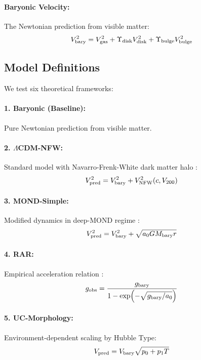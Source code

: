 \documentclass[aps,prd,twocolumn,superscriptaddress,nofootinbib,longbibliography]{revtex4-2}
\begin{document}
\paragraph{Baryonic Velocity:}
The Newtonian prediction from visible matter:
\begin{equation}
V_{\rm bary}^2 = V_{\rm gas}^2 + \Upsilon_{\rm disk} V_{\rm disk}^2 + \Upsilon_{\rm bulge} V_{\rm bulge}^2
\end{equation}

\subsection{Model Definitions}

We test six theoretical frameworks:

\paragraph{1. Baryonic (Baseline):} Pure Newtonian prediction from visible matter.

\paragraph{2. $\Lambda$CDM-NFW:} Standard model with Navarro-Frenk-White dark matter halo \cite{Navarro1997}:
\begin{equation}
V_{\rm pred}^2 = V_{\rm bary}^2 + V_{\rm NFW}^2(c, V_{200})
\end{equation}

\paragraph{3. MOND-Simple:} Modified dynamics in deep-MOND regime \cite{Milgrom1983}:
\begin{equation}
V_{\rm pred}^2 = V_{\rm bary}^2 + \sqrt{a_0 G M_{\rm bary} r}
\end{equation}

\paragraph{4. RAR:} Empirical acceleration relation \cite{McGaugh2016}:
\begin{equation}
g_{\rm obs} = \frac{g_{\rm bary}}{1 - \exp(-\sqrt{g_{\rm bary}/a_0})}
\end{equation}

\paragraph{5. UC-Morphology:} Environment-dependent scaling by Hubble Type:
\begin{equation}
V_{\rm pred} = V_{\rm bary} \sqrt{p_0 + p_1 T}
\end{equation}
\end{document}
